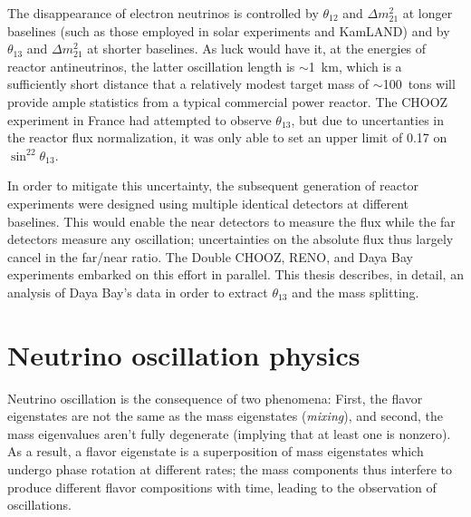 \documentclass[../thesis.tex]{subfiles}
\begin{document}
The disappearance of electron neutrinos is controlled by $\theta_{12}$ and $\Delta m^2_{21}$ at longer baselines (such as those employed in solar experiments and KamLAND) and by $\theta_{13}$ and $\Delta m^2_{21}$ at shorter baselines. As luck would have it, at the energies of reactor antineutrinos, the latter oscillation length is $\sim$1~km, which is a sufficiently short distance that a relatively modest target mass of $\sim$100~tons will provide ample statistics from a typical commercial power reactor. The CHOOZ experiment in France had attempted to observe $\theta_{13}$, but due to uncertanties in the reactor flux normalization, it was only able to set an upper limit of 0.17 on $\sin^22\theta_{13}$.

In order to mitigate this uncertainty, the subsequent generation of reactor experiments were designed using multiple identical detectors at different baselines. This would enable the near detectors to measure the flux while the far detectors measure any oscillation; uncertainties on the absolute flux thus largely cancel in the far/near ratio. The Double CHOOZ, RENO, and Daya Bay experiments embarked on this effort in parallel. This thesis describes, in detail, an analysis of Daya Bay's data in order to extract $\theta_{13}$ and the mass splitting.

\section{Neutrino oscillation physics}
\label{sec:oscPhysics}

Neutrino oscillation is the consequence of two phenomena: First, the flavor eigenstates are not the same as the mass eigenstates (\emph{mixing}), and second, the mass eigenvalues aren't fully degenerate (implying that at least one is nonzero). As a result, a flavor eigenstate is a superposition of mass eigenstates which undergo phase rotation at different rates; the mass components thus interfere to produce different flavor compositions with time, leading to the observation of oscillations.
\end{document}
